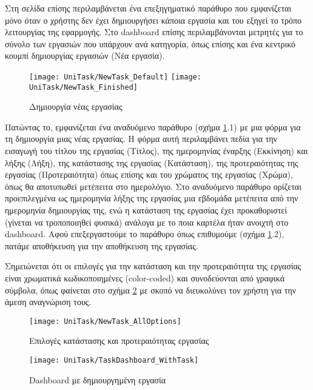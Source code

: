         Στη σελίδα επίσης περιλαμβάνεται ένα επεξηγηματικό παράθυρο που εμφανίζεται μόνο όταν ο χρήστης δεν έχει δημιουργήσει κάποια εργασία και του εξηγεί το τρόπο λειτουργίας της εφαρμογής. Στο {\Zona dashboard} επίσης περιλαμβάνονται μετρητές για το σύνολο των εργασιών που υπάρχουν ανά κατηγορία, όπως επίσης και ένα κεντρικό κουμπί δημιουργίας εργασιών ({\Zona Νέα εργασία}).

        \begin{figure}[h!] \noindent \centering
            \texttt{[image: UniTask/NewTask\_Default]}
            \texttt{[image: UniTask/NewTask\_Finished]}
            \caption{\centering Δημιουργία νέας εργασίας}
            \label{fig:unitask_NewTask}
        \end{figure}

        Πατώντας το, εμφανίζεται ένα αναδυόμενο παράθυρο (σχήμα \ref{fig:unitask_NewTask}.1) με μια φόρμα για τη δημιουργία μιας νέας εργασίας. Η φόρμα αυτή περιλαμβάνει πεδία για την εισαγωγή του τίτλου της εργασίας ({\Zona Τίτλος}), της ημερομηνίας έναρξης ({\Zona Εκκίνηση}) και λήξης ({\Zona Λήξη}), της κατάστασης της εργασίας ({\Zona Κατάσταση}), της προτεραιότητας της εργασίας ({\Zona Προτεραιότητα}) όπως επίσης και του χρώματος της εργασίας ({\Zona Χρώμα}), όπως θα αποτυπωθεί μετέπειτα στο ημερολόγιο. Στο αναδυόμενο παράθυρο ορίζεται προεπιλεγμένα ως ημερομηνία λήξης της εργασίας μια εβδομάδα μετέπειτα από την ημερομηνία δημιουργίας της, ενώ η κατάσταση της εργασίας έχει προκαθοριστεί (γίνεται να τροποποιηθεί φυσικά) ανάλογα με το ποια καρτέλα ήταν ανοιχτή στο dashboard. Αφού επεξεργαστούμε το παράθυρο όπως επιθυμούμε (σχήμα \ref{fig:unitask_NewTask}.2), πατάμε αποθήκευση για την αποθήκευση της εργασίας.

        Σημειώνεται ότι οι επιλογές για την κατάσταση και την προτεραιότητα της εργασίας είναι χρωματικά κωδικοποιημένες (color-coded) και συνοδεύονται από γραφικά σύμβολα, όπως φαίνεται στο σχήμα \ref{fig:unitask_NewTask_AllOptions} με σκοπό να διευκολύνει τον χρήστη για την άμεση αναγνώριση τους.

        \begin{figure}[h!] \noindent \centering
            \texttt{[image: UniTask/NewTask\_AllOptions]}
            \caption{\centering Επιλογές κατάστασης και προτεραιότητας εργασίας}
            \label{fig:unitask_NewTask_AllOptions}
        \end{figure}

        \begin{figure}[h!] \noindent \centering
            \texttt{[image: UniTask/TaskDashboard\_WithTask]}
            \caption{\centering Dashboard με δημιουργημένη εργασία}
            \label{fig:unitask_TaskDashboard_WithTask}
        \end{figure}

